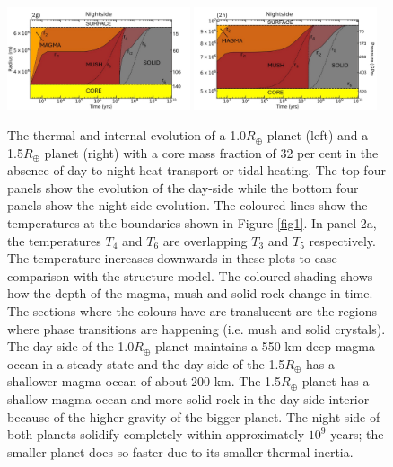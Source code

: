 \documentclass[fleqn,usenatbib]{mnras}
\begin{document}
\begin{figure}
\includegraphics[width=0.48\textwidth]{2g.jpg}
\includegraphics[width=0.48\textwidth]{2h.jpg}

\caption{The thermal and internal evolution of a 1.0$R_{\oplus}$ planet (left) and a 1.5$R_{\oplus}$ planet (right) with a core mass fraction of 32 per cent in the absence of day-to-night heat transport or tidal heating. The top four panels show the evolution of the day-side while the bottom four panels show the night-side evolution. The coloured lines show the temperatures at the boundaries shown in Figure \ref{fig1}. In panel 2a, the temperatures $T_{4}$ and $T_{6}$ are overlapping $T_{3}$ and $T_{5}$ respectively. The temperature increases downwards in these plots to ease comparison with the structure model. The coloured shading shows how the depth of the magma, mush and solid rock change in time. The sections where the colours have are translucent are the regions where phase transitions are happening (i.e. mush and solid crystals). The day-side of the 1.0$R_{\oplus}$ planet maintains a 550 km deep magma ocean in a steady state and the day-side of the 1.5$R_{\oplus}$ has a shallower magma ocean of about 200 km. The 1.5$R_{\oplus}$ planet has a shallow magma ocean and more solid rock in the day-side interior because of the higher gravity of the bigger planet. The night-side of both planets solidify completely within approximately $10^{9}$ years; the smaller planet does so faster due to its smaller thermal inertia.}
\label{fig2}
\end{figure}
\end{document}
